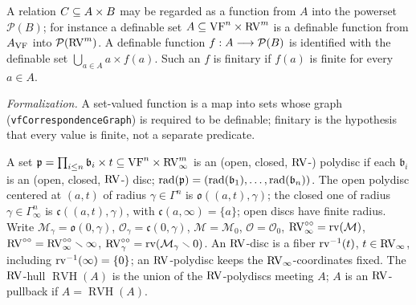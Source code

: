 \setcounter{theorem}{3}
\begin{definition}
\label{s2-relations-as-functions}
\leanok
{}
A relation $C \subseteq A \times B$ may be regarded as a function from $A$ into the powerset $\mathcal{P}(B)$; for instance a definable set $A \subseteq \mathrm{VF}^n \times \mathrm{RV}^m$ is a definable function from $A_{\mathrm{VF}}$ into $\mathcal{P}(\mathrm{RV}^m)$. A definable function $f : A \longrightarrow \mathcal{P}(B)$ is identified with the definable set $\bigcup_{a \in A} a \times f(a)$. Such an $f$ is finitary if $f(a)$ is finite for every $a \in A$.

\emph{Formalization.} A set-valued function is a map into sets whose graph (\texttt{vfCorrespondenceGraph}) is required to be definable; finitary is the hypothesis that every value is finite, not a separate predicate.
\end{definition}

\setcounter{theorem}{4}
\begin{definition}
\label{defn-disc}
\leanok
{}
A set $\mathfrak{p} = \prod_{i \leq n} \mathfrak{b}_i \times t \subseteq \mathrm{VF}^n \times \mathrm{RV}_\infty^m$ is an (open, closed, $\mathrm{RV}$-) polydisc if each $\mathfrak{b}_i$ is an (open, closed, $\mathrm{RV}$-) disc; $\operatorname{rad}(\mathfrak{p}) = (\operatorname{rad}(\mathfrak{b}_1), \ldots, \operatorname{rad}(\mathfrak{b}_n))$. The open polydisc centered at $(a,t)$ of radius $\gamma \in \Gamma^n$ is $\mathfrak{o}((a,t),\gamma)$; the closed one of radius $\gamma \in \Gamma_\infty^n$ is $\mathfrak{c}((a,t),\gamma)$, with $\mathfrak{c}(a,\infty) = \{a\}$; open discs have finite radius. Write $\mathcal{M}_\gamma = \mathfrak{o}(0,\gamma)$, $\mathcal{O}_\gamma = \mathfrak{c}(0,\gamma)$, $\mathcal{M} = \mathcal{M}_0$, $\mathcal{O} = \mathcal{O}_0$, $\mathrm{RV}^{\circ\circ}_\infty = \operatorname{rv}(\mathcal{M})$, $\mathrm{RV}^{\circ\circ} = \mathrm{RV}^{\circ\circ}_\infty \smallsetminus \infty$, $\mathrm{RV}^{\circ\circ}_\gamma = \operatorname{rv}(\mathcal{M}_\gamma \smallsetminus 0)$. An $\mathrm{RV}$-disc is a fiber $\operatorname{rv}^{-1}(t)$, $t \in \mathrm{RV}_\infty$, including $\operatorname{rv}^{-1}(\infty) = \{0\}$; an $\mathrm{RV}$-polydisc keeps the $\mathrm{RV}_\infty$-coordinates fixed. The $\mathrm{RV}$-hull $\operatorname{RVH}(A)$ is the union of the $\mathrm{RV}$-polydiscs meeting $A$; $A$ is an $\mathrm{RV}$-pullback if $A = \operatorname{RVH}(A)$.
\end{definition}

